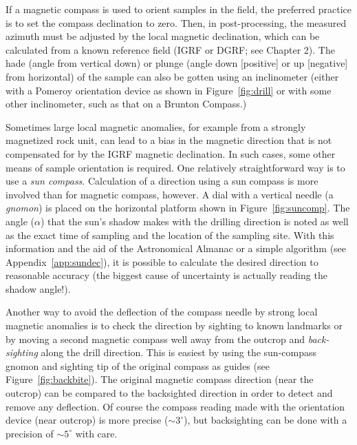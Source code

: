 If a magnetic compass is used to orient samples in the field, the preferred practice is to set the compass declination to zero.  Then, in post-processing,  the
measured azimuth must be adjusted by the local magnetic declination,
which can be calculated from a known reference 
field (IGRF or DGRF; see Chapter 2). The hade (angle from vertical down) or plunge (angle down [positive] or up [negative] from horizontal) of the sample can also be gotten using an inclinometer (either with a Pomeroy orientation device as shown in Figure~\ref{fig:drill} or with some other inclinometer, such as that on a Brunton Compass.)


Sometimes large local magnetic anomalies, for example from a strongly magnetized rock unit,  can lead to a bias in the magnetic direction that is not compensated for by the IGRF magnetic declination.  In such cases, some other means of sample orientation is required.  One relatively straightforward way is to use a 
{\it sun compass}.  Calculation of a direction using a 
sun compass is 
more involved than for magnetic compass, however.  A dial with a vertical needle (a {\it gnomon}) is placed on the
horizontal platform shown in Figure~\ref{fig:suncomp}.  The angle ($\alpha$) that the
sun's shadow makes with the drilling direction is noted as well as the
exact time of sampling and the location of the sampling site. 
 With this information and
the aid of the Astronomical Almanac or a simple algorithm (see Appendix~\ref{app:sundec}), it is
possible to calculate the desired direction to reasonable
accuracy (the biggest cause of uncertainty is actually reading the
shadow angle!).  

Another way to avoid the deflection of the compass needle by strong local magnetic anomalies is to check the direction by sighting to known landmarks or by moving  a second magnetic  compass well away from the outcrop and  
{\it back-sighting} along the drill direction.  This is easiest by   using the sun-compass gnomon and sighting tip of the original compass as guides (see Figure~\ref{fig:backbite}).  The original magnetic compass direction (near the outcrop) can be  compared to the backsighted direction in order to detect and remove any deflection.  Of course the compass reading made with the orientation device (near outcrop) is more precise ($\sim 3^{\circ}$), but backsighting can be done with a precision of $\sim 5^{\circ}$ with care.    


